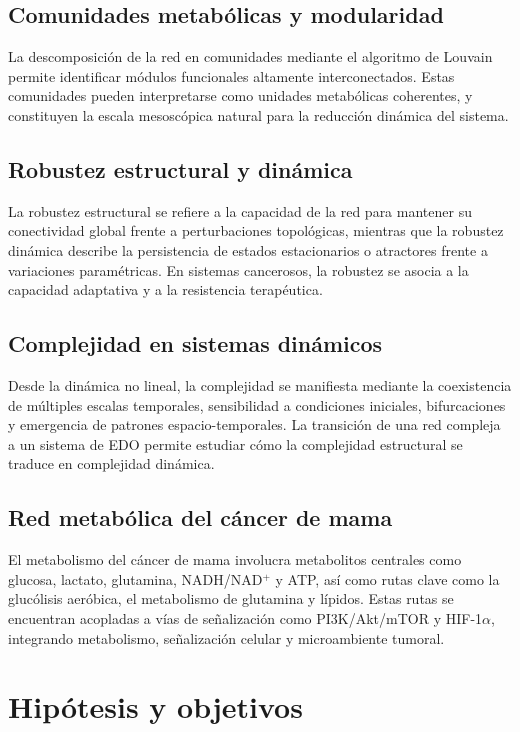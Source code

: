 \documentclass[12pt,spanish]{article}
\begin{document}
	\subsection{Comunidades metabólicas y modularidad}
	
	La descomposición de la red en comunidades mediante el algoritmo de Louvain permite identificar módulos funcionales altamente interconectados. Estas comunidades pueden interpretarse como unidades metabólicas coherentes, y constituyen la escala mesoscópica natural para la reducción dinámica del sistema.
	
	\subsection{Robustez estructural y dinámica}
	
	La robustez estructural se refiere a la capacidad de la red para mantener su conectividad global frente a perturbaciones topológicas, mientras que la robustez dinámica describe la persistencia de estados estacionarios o atractores frente a variaciones paramétricas. En sistemas cancerosos, la robustez se asocia a la capacidad adaptativa y a la resistencia terapéutica.
	
	\subsection{Complejidad en sistemas dinámicos}
	
	Desde la dinámica no lineal, la complejidad se manifiesta mediante la coexistencia de múltiples escalas temporales, sensibilidad a condiciones iniciales, bifurcaciones y emergencia de patrones espacio-temporales. La transición de una red compleja a un sistema de EDO permite estudiar cómo la complejidad estructural se traduce en complejidad dinámica.
	
	\subsection{Red metabólica del cáncer de mama}
	
	El metabolismo del cáncer de mama involucra metabolitos centrales como glucosa, lactato, glutamina, NADH/NAD$^+$ y ATP, así como rutas clave como la glucólisis aeróbica, el metabolismo de glutamina y lípidos. Estas rutas se encuentran acopladas a vías de señalización como PI3K/Akt/mTOR y HIF-1$\alpha$, integrando metabolismo, señalización celular y microambiente tumoral.
	
	\section{Hipótesis y objetivos}
	
\end{document}

